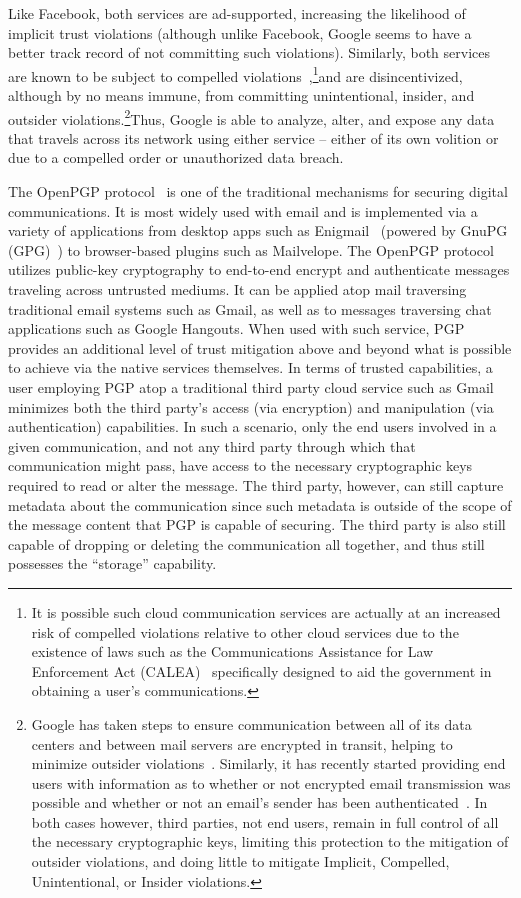 Like Facebook, both services are ad-supported, increasing the
likelihood of implicit trust violations (although unlike Facebook,
Google seems to have a better track record of not committing such
violations). Similarly, both services are known to be subject to
compelled violations~\cite{google-transparency},\footnote{It is
  possible such cloud communication services are actually at an
  increased risk of compelled violations relative to other cloud
  services due to the existence of laws such as the Communications
  Assistance for Law Enforcement Act (CALEA)~\cite{calea-usc,
    calea-fcc} specifically designed to aid the government in
  obtaining a user's communications.}and are disincentivized, although
by no means immune, from committing unintentional, insider, and
outsider violations.\footnote{Google has taken steps to ensure
  communication between all of its data centers and between mail
  servers are encrypted in transit, helping to minimize outsider
  violations~\cite{gmail-blog-encryption}. Similarly, it has recently
  started providing end users with information as to whether or not
  encrypted email transmission was possible and whether or not an
  email's sender has been authenticated~\cite{gmail-blog-indicators}.
  In both cases however, third parties, not end users, remain in full
  control of all the necessary cryptographic keys, limiting this
  protection to the mitigation of outsider violations, and doing
  little to mitigate Implicit, Compelled, Unintentional, or Insider
  violations.}Thus, Google is able to analyze, alter, and expose any
data that travels across its network using either service -- either of
its own volition or due to a compelled order or unauthorized data
breach.

The OpenPGP protocol~\cite{callas2007} is one of the traditional
mechanisms for securing digital communications. It is most widely used
with email and is implemented via a variety of applications from
desktop apps such as Enigmail~\cite{enigmail} (powered by GnuPG
(GPG)~\cite{gnupg}) to browser-based plugins such as
Mailvelope\cite{mailvelope}. The OpenPGP protocol utilizes public-key
cryptography to end-to-end encrypt and authenticate messages traveling
across untrusted mediums. It can be applied atop mail traversing
traditional email systems such as Gmail, as well as to messages
traversing chat applications such as Google Hangouts. When used with
such service, PGP provides an additional level of trust mitigation
above and beyond what is possible to achieve via the native services
themselves. In terms of trusted capabilities, a user employing PGP
atop a traditional third party cloud service such as Gmail minimizes
both the third party's access (via encryption) and manipulation (via
authentication) capabilities. In such a scenario, only the end users
involved in a given communication, and not any third party through
which that communication might pass, have access to the necessary
cryptographic keys required to read or alter the message. The third
party, however, can still capture metadata about the communication
since such metadata is outside of the scope of the message content
that PGP is capable of securing. The third party is also still capable
of dropping or deleting the communication all together, and thus still
possesses the ``storage'' capability.

